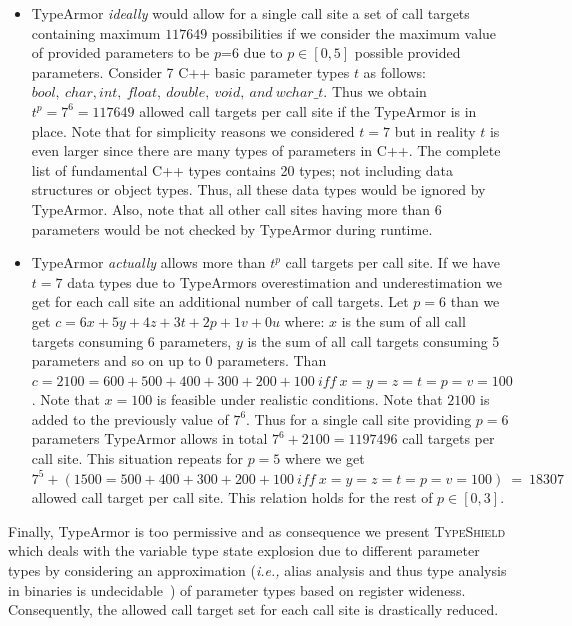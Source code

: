 \begin{itemize}
\item TypeArmor \textit{ideally} would allow for a single call site a set of call targets containing maximum $117649$ possibilities if we consider the maximum value of provided parameters to be
$p$=6 due to $p \in [0, 5]$ possible provided parameters. Consider 7 C++ basic parameter types $t$ as follows: ${bool, \ char, int, \ float, \ double, \ void, \ and \ wchar\_t}$. 
Thus we obtain $t^{p}=7^{6}=117649$ allowed call targets per call site if the TypeArmor is in place.
Note that for simplicity reasons we considered $t=7$ but in reality $t$ is even larger since there are many types of parameters in C++. 
The complete list of fundamental C++ types contains 20 types; not including data structures or object types.
Thus, all these data types would be ignored by TypeArmor. Also, note that all other call sites having more than 6 parameters 
would be not checked by TypeArmor during runtime.

\item TypeArmor \textit{actually} allows more than $t^{p}$ call targets per call site.
If we have $t=7$ data types due to TypeArmors overestimation and underestimation we get for each call site an additional
number of call targets. Let $p=6$ than we get $c = 6x + 5y+ 4z + 3t + 2p + 1v + 0u$ where:
$x$ is the sum of all call targets consuming 6 parameters, 
$y$ is the sum of all call targets consuming 5 parameters and so on up to 0 parameters. 
Than $c = 2100 = 600 + 500 + 400 + 300 + 200 + 100 \ iff \ x=y=z=t=p=v=100$. 
Note that $x=100$ is feasible under realistic conditions. Note that $2100$ is added to the previously value of $7^{6}$. 
Thus for a single call site providing $p=6$ parameters TypeArmor allows in total $7^{6}+2100 = 1197496$ call targets per call site.
This situation repeats for $p=5$ where we get $7^{5} + (1500 = 500 + 400 + 300 + 200 + 100 \ iff \ x=y=z=t=p=v=100) \ = \ 18307$ allowed call target per call site. 
This relation holds for the rest of $p \in [0, 3]$.
\end{itemize}
Finally, TypeArmor is too permissive and as consequence we present 
\textsc{TypeShield} which deals with the variable type state explosion due to different parameter types by considering an 
approximation (\textit{i.e.,} alias analysis and thus type analysis in binaries is undecidable~\cite{alias:undecidable}) of 
parameter types based on register wideness. Consequently, the allowed call target set for each call site is drastically reduced.


